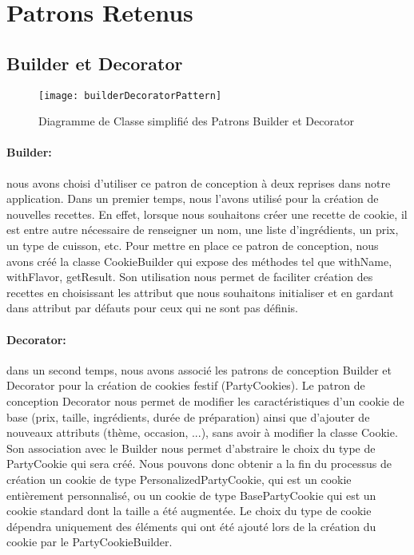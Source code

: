 \section{Patrons Retenus}

\subsection{Builder et Decorator}

\begin{figure}[!ht]
\texttt{[image: builderDecoratorPattern]}
\centering
\caption{Diagramme de Classe simplifié des Patrons Builder et Decorator}
\label{uml:builder-decorator}
\end{figure}

\paragraph{Builder: } nous avons choisi 
d'utiliser ce patron de conception à deux reprises dans notre application.
Dans un premier temps, nous l'avons utilisé pour la création de nouvelles recettes.
En effet, lorsque nous souhaitons créer une recette de cookie, il est entre autre nécessaire 
de renseigner un nom, une liste d'ingrédients, un prix, un type de cuisson, etc.
Pour mettre en place ce patron de conception, nous avons créé la classe CookieBuilder qui expose des 
méthodes tel que withName, withFlavor, getResult. 
Son utilisation nous permet de faciliter création des recettes en choisissant les attribut que 
nous souhaitons initialiser et en gardant dans attribut par défauts pour ceux qui ne sont pas définis.

\paragraph{Decorator: } dans un second temps, nous avons associé les patrons de conception Builder et Decorator
pour la création de cookies festif (PartyCookies). Le patron de conception Decorator nous permet 
de modifier les caractéristiques d'un cookie de base (prix, taille, ingrédients, durée de préparation) ainsi que d'ajouter 
de nouveaux attributs (thème, occasion, ...), sans avoir à modifier la classe Cookie. 
Son association avec le Builder nous permet d'abstraire le choix du type de PartyCookie qui sera créé.
Nous pouvons donc obtenir a la fin du processus de création un cookie de type PersonalizedPartyCookie, qui est un cookie entièrement personnalisé,
ou un cookie de type BasePartyCookie qui est un cookie standard dont la taille a été augmentée.
Le choix du type de cookie dépendra uniquement des éléments qui ont été ajouté lors de la création du cookie par le PartyCookieBuilder.


